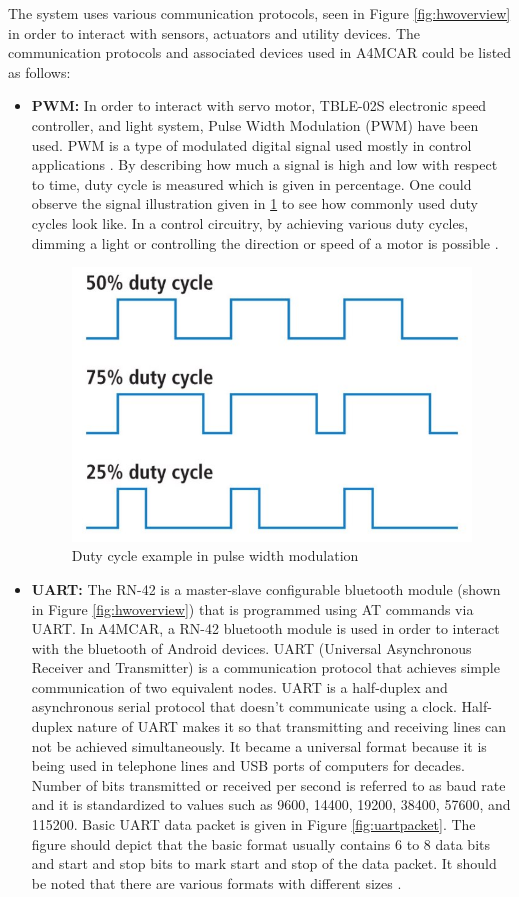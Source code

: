 The system uses various communication protocols, seen in Figure \ref{fig:hwoverview} in order to interact with sensors, actuators and utility devices. The communication protocols and associated devices used in A4MCAR could be listed as follows:
\begin{itemize}
	\item \textbf{PWM:} In order to interact with servo motor, TBLE-02S electronic speed controller, and light system, Pulse Width Modulation (PWM) have been used. PWM is a type of modulated digital signal used mostly in control applications \cite{pwm}. By describing how much a signal is high and low with respect to time, duty cycle is measured which is given in percentage. One could observe the signal illustration given in \ref{fig:pwm} to see how commonly used duty cycles look like. In a control circuitry, by achieving various duty cycles, dimming a light or controlling the direction or speed of a motor is possible \cite{pwm}.
	\begin{figure}[!ht]
		\centering
		\captionsetup{justification=centering}
		\includegraphics[scale=0.5]{content/images/pwm.jpg}
		\caption{Duty cycle example in pulse width modulation \cite{pwm}}
		\label{fig:pwm}
	\end{figure}
	\item \textbf{UART:} The RN-42 is a master-slave configurable bluetooth module (shown in Figure \ref{fig:hwoverview}) that is programmed using AT commands via UART. In A4MCAR, a RN-42 bluetooth module is used in order to interact with the bluetooth of Android devices. UART (Universal Asynchronous Receiver and Transmitter) is a communication protocol that achieves simple communication of two equivalent nodes. UART is a half-duplex and asynchronous serial protocol that doesn't communicate using a clock. Half-duplex nature of UART makes it so that transmitting and receiving lines can not be achieved simultaneously. It became a universal format because it is being used in telephone lines and USB ports of computers for decades. Number of bits transmitted or received per second is referred to as baud rate and it is standardized to values such as 9600, 14400, 19200, 38400, 57600, and 115200. Basic UART data packet is given in Figure \ref{fig:uartpacket}. The figure should depict that the basic format usually contains 6 to 8 data bits and start and stop bits to mark start and stop of the data packet. It should be noted that there are various formats with different sizes \cite{uart}.

\end{itemize}
